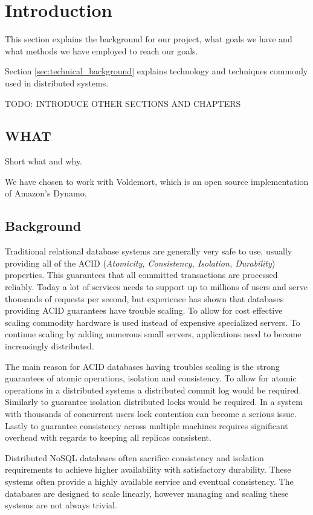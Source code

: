 
\section{Introduction}
This section explains the background for our project, what goals we have and what methods we have employed to reach our goals. 

Section \ref{sec:technical_background} explains technology and techniques commonly used in distributed systems.

TODO: INTRODUCE OTHER SECTIONS AND CHAPTERS

\subsection{WHAT}
Short what and why.

We have chosen to work with Voldemort, which is an open source implementation of Amazon’s Dynamo. 


\subsection{Background}
Traditional relational database systems are generally very safe to use, usually providing all of the ACID (\emph{Atomicity, Consistency, Isolation, Durability}) properties.
This guarantees that all committed transactions are processed reliably. 
Today a lot of services needs to support up to millions of users and serve thousands of requests per second, but experience has shown that databases providing ACID guarantees have trouble scaling. 
To allow for cost effective scaling commodity hardware is used instead of expensive specialized servers. To continue scaling by adding numerous small servers, applications need to become increasingly distributed.

The main reason for ACID databases having troubles scaling is the strong guarantees of atomic operations, isolation and consistency. 
To allow for atomic operations in a distributed systems a distributed commit log would be required. 
Similarly to guarantee isolation distributed locks would be required. In a system with thousands of concurrent users lock contention can become a serious issue. 
Lastly to guarantee consistency across multiple machines requires significant overhead with regards to keeping all replicas consistent. 

Distributed NoSQL databases often sacrifice consistency and isolation requirements to achieve higher availability with satisfactory durability. These systems often provide a highly available service and eventual consistency.
The databases are designed to scale linearly, however managing and scaling these systems are not always trivial\cite{tellybug}. 



